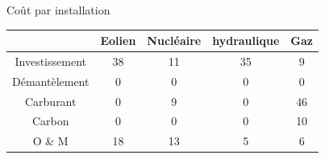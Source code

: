 \begin{parag}{Coût par installation}
    \begin{center}
    \begin{tabular}{|c|c|c|c|c|}
	    \hline
	    & Eolien & Nucléaire & hydraulique & Gaz \\
	    \hline
	    \hline
	    Investissement  & 38 & 11 & 35 & 9 \\
	    \hline 
	     Démantèlement& 0 & 0 & 0 & 0 \\
	    \hline 
	     Carburant& 0 & 9 & 0 & 46 \\
	    \hline 
	     Carbon& 0 & 0 & 0 & 10 \\
	    \hline 
	     O \& M & 18 & 13 & 5 & 6 \\
	    \hline 
    \end{tabular}
    \end{center}
    
\end{parag}





